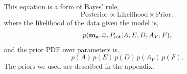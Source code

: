 This equation is a form of Bayes' rule,
\begin{equation} \label{eqn:eqn2}
\mathrm{Posterior} \propto \mathrm{Likelihood} \times \mathrm{Prior},
\end{equation}
where the likelihood of the data given the model is,
\begin{equation} \label{eqn:full_likelihood}
    p({\bf m_x}, \bar{\omega}, P_{\mathrm{rot}}|A, E, D, A_V, F),
\end{equation}
and the prior PDF over parameters is,
\begin{equation} \label{eqn:prior}
    p(A)\, p(E)\, p(D)\, p(A_V)\, p(F).
\end{equation}
The priors we used are described in the appendix.

